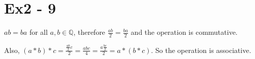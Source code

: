 \section*{Ex2 - 9}
$ ab = ba $ for all $ a, b \in \mathbb{Q} $, therefore $ \frac{ab}{2} = \frac{ba}{2} $ and the operation is commutative.

Also, $ (a * b) * c = \frac{\frac{ab}{2}c}{2} = \frac{abc}{4} = \frac{a\frac{bc}{2}}{2} = a * (b * c) $. So the operation is associative.